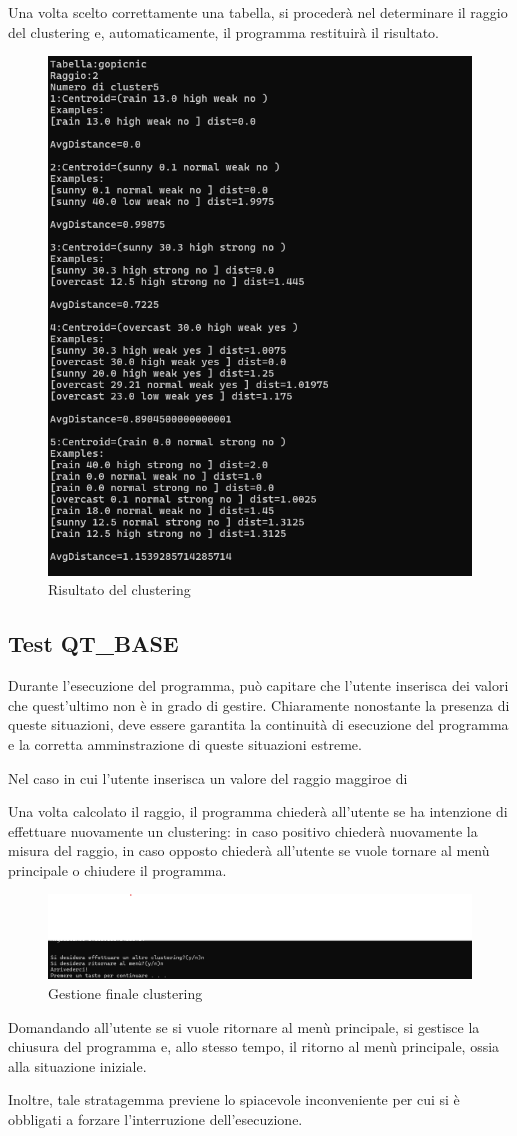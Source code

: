 Una volta scelto correttamente una tabella, si procederà nel determinare il raggio del clustering e, automaticamente, il programma restituirà il risultato. 

\begin{figure}[h!]
    \centering
    \includegraphics[width = 0.5 \textwidth]{images/risultato atteso.png}
    \caption{Risultato del clustering}
\end{figure}

\subsection{Test QT\_BASE}

Durante l'esecuzione del programma, può capitare che l'utente inserisca dei valori che quest'ultimo non è in grado di gestire. Chiaramente nonostante la presenza di queste situazioni, deve essere garantita la continuità di esecuzione del programma e la corretta amminstrazione di queste situazioni estreme.

Nel caso in cui l'utente inserisca un valore del raggio maggiroe di 

Una volta calcolato il raggio, il programma chiederà all'utente se ha intenzione di effettuare nuovamente un clustering: in caso positivo chiederà nuovamente la misura del raggio, in caso opposto chiederà all'utente se vuole tornare al menù principale o chiudere il programma. 


\begin{figure}[h]
    \centering
    \includegraphics[width = .5\textwidth]{images/richeista continuazione.png}
    \caption{Gestione finale clustering}
\end{figure}

Domandando all'utente se si vuole ritornare al menù principale, si  gestisce la chiusura del programma e, allo stesso tempo, il ritorno al menù principale, ossia alla situazione iniziale. 

Inoltre, tale stratagemma previene lo spiacevole inconveniente per cui si è obbligati a forzare l'interruzione dell'esecuzione. 




